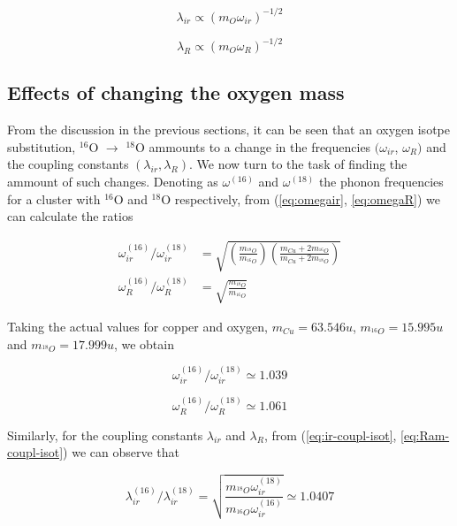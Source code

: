 \begin{equation}
  \label{eq:ir-coupl-isot}
  \lambda_{ir}\propto (m_O\omega_{ir})^{-1/2}
\end{equation}

\begin{equation}
  \label{eq:Ram-coupl-isot}
  \lambda_R\propto (m_O\omega_{R})^{-1/2}
\end{equation}


\subsection{Effects of changing the oxygen mass}

From the discussion in the previous sections, it can be seen that an oxygen isotpe substitution, $^{16}$O $\rightarrow$ $^{18}$O ammounts to a change in the frequencies  $(\omega_{ir}$, $\omega_R)$ and the coupling constants $(\lambda_{ir},\lambda_R)$.
We now turn to the task of finding the ammount of such changes.
Denoting as $\omega^{(16)}$ and $\omega^{(18)}$ the phonon frequencies for a cluster with $^{16}$O and $^{18}$O respectively, from (\ref{eq:omegair}, \ref{eq:omegaR}) we can calculate the ratios

\begin{align}
  \omega^{(16)}_{ir}/\omega^{(18)}_{ir}
  & =\sqrt{\left(\frac{m_{^{18}O}}{m_{^{16}O}}\right)\left(\frac{m_{Cu}+2m_{^{16}O}}{m_{Cu}+2m_{^{18}O}}\right)} \\
  \omega^{(16)}_{R}/\omega^{(18)}_{R}
  & =\sqrt{\frac{m_{^{18}O}}{m_{^{16}O}}}
\end{align}

Taking the actual values for copper and oxygen, $m_{Cu}=63.546u$, $m_{^{16}O}=15.995u$ and $m_{^{18}O}=17.999u$, we obtain

\begin{equation}
  \label{eq:omega-ir-isot}
  \omega^{(16)}_{ir} / \omega^{(18)}_{ir} \simeq 1.039
\end{equation}

\begin{equation}
  \label{eq:omega-R-isot}
  \omega^{(16)}_{R} / \omega^{(18)}_{R} \simeq 1.061
\end{equation}

Similarly, for the coupling constants $\lambda_{ir}$ and $\lambda_R$, from (\ref{eq:ir-coupl-isot}, \ref{eq:Ram-coupl-isot}) we can observe that

\begin{equation}
  \label{eq:lambda-ir-isot}
  \lambda_{ir}^{(16)}/\lambda_{ir}^{(18)}=\sqrt{\frac{m_{^{18}O}\omega_{ir}^{(18)}}{m_{^{16}O}\omega_{ir}^{(16)}}}\simeq 1.0407
\end{equation}

